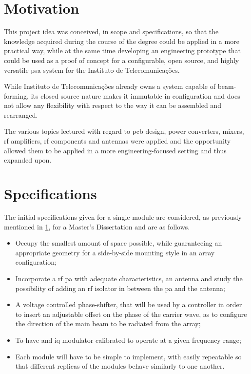 \section{Motivation}
\label{section:ch1_motivation}

\par This project idea was conceived, in scope and specifications, so that the knowledge acquired during the course of the degree could be applied in a more practical way, while at the same time developing an engineering prototype that could be used as a proof of concept for a configurable, open source, and highly versatile \ac{psa} system for the Instituto de Telecomunicações.

\par While Instituto de Telecomunicações already owns a system capable of beam-forming, its closed source nature makes it immutable in configuration and does not allow any flexibility with respect to the way it can be assembled and rearranged.

\par The various topics lectured with regard to \ac{pcb} design, power converters, mixers, \ac{rf} amplifiers, \ac{rf} components and antennas were applied and the opportunity allowed them to be applied in a more engineering-focused setting and thus expanded upon.


\section{Specifications}
\label{section:ch1_specifications}

\par The initial specifications given for a single module are considered, as previously mentioned in \ref{section:ch1_motivation}, for a Master's Dissertation and are as follows.

\begin{itemize} 
    \item Occupy the smallest amount of space possible, while guaranteeing an appropriate geometry for a side-by-side mounting style in an array configuration;
    \item Incorporate a \ac{rf} \ac{pa} with adequate characteristics, an antenna and study the possibility of adding an \ac{rf} isolator in between the \ac{pa} and the antenna;
    \item A voltage controlled phase-shifter, that will be used by a controller in order to insert an adjustable offset on the phase of the carrier wave, as to configure the direction of the main beam to be radiated from the array;
    \item To have and \ac{iq} modulator calibrated to operate at a given frequency range;
    \item Each module will have to be simple to implement, with easily repeatable so that different replicas of the modules behave similarly to one another.
\end{itemize}

